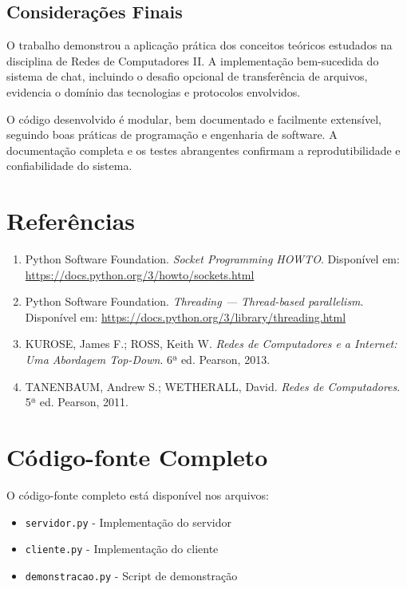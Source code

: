 \documentclass[12pt,a4paper]{article}
\begin{document}
\subsection{Considerações Finais}

O trabalho demonstrou a aplicação prática dos conceitos teóricos estudados na disciplina de Redes de Computadores II. A implementação bem-sucedida do sistema de chat, incluindo o desafio opcional de transferência de arquivos, evidencia o domínio das tecnologias e protocolos envolvidos.

O código desenvolvido é modular, bem documentado e facilmente extensível, seguindo boas práticas de programação e engenharia de software. A documentação completa e os testes abrangentes confirmam a reprodutibilidade e confiabilidade do sistema.

\section{Referências}

\begin{enumerate}
    \item Python Software Foundation. \textit{Socket Programming HOWTO}. Disponível em: \url{https://docs.python.org/3/howto/sockets.html}
    
    \item Python Software Foundation. \textit{Threading — Thread-based parallelism}. Disponível em: \url{https://docs.python.org/3/library/threading.html}
    
    \item KUROSE, James F.; ROSS, Keith W. \textit{Redes de Computadores e a Internet: Uma Abordagem Top-Down}. 6ª ed. Pearson, 2013.
    
    \item TANENBAUM, Andrew S.; WETHERALL, David. \textit{Redes de Computadores}. 5ª ed. Pearson, 2011.
\end{enumerate}

\newpage
\appendix

\section{Código-fonte Completo}

O código-fonte completo está disponível nos arquivos:
\begin{itemize}
    \item \texttt{servidor.py} - Implementação do servidor
    \item \texttt{cliente.py} - Implementação do cliente
    \item \texttt{demonstracao.py} - Script de demonstração
\end{itemize}
\end{document}
